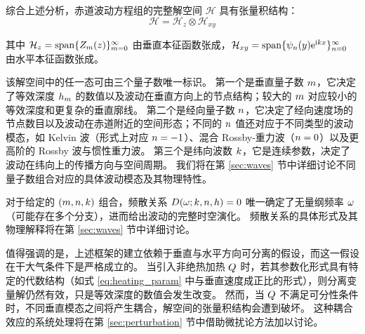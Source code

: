 综合上述分析，赤道波动方程组的完整解空间 $\mathcal{H}$ 具有张量积结构：
\begin{equation}
    \mathcal{H} = \mathcal{H}_z \otimes \mathcal{H}_{xy}
    \label{eq:solution_space}
\end{equation}

其中 $\mathcal{H}_z = \mathrm{span}\{Z_m(z)\}_{m=0}^\infty$ 由垂直本征函数张成，$\mathcal{H}_{xy} = \mathrm{span}\{\psi_{n}(y)\mathrm{e}^{\mathrm{i}k x}\}_{n=0}^\infty$ 由水平本征函数张成。

该解空间中的任一态可由三个量子数唯一标识。
第一个是垂直量子数 $m$，它决定了等效深度 $h_m$ 的数值以及波动在垂直方向上的节点结构；较大的 $m$ 对应较小的等效深度和更复杂的垂直廓线。
第二个是经向量子数 $n$，它决定了经向速度场的节点数目以及波动在赤道附近的空间形态；不同的 $n$ 值还对应于不同类型的波动模态，如 Kelvin 波（形式上对应 $n = -1$）、混合 Rossby-重力波（$n = 0$）以及更高阶的 Rossby 波与惯性重力波。
第三个是纬向波数 $k$，它是连续参数，决定了波动在纬向上的传播方向与空间周期。
我们将在第 \ref{sec:waves} 节中详细讨论不同量子数组合对应的具体波动模态及其物理特性。

对于给定的 $(m, n, k)$ 组合，频散关系 $D(\omega; k, n, h) = 0$ 唯一确定了无量纲频率 $\omega$（可能存在多个分支），进而给出波动的完整时空演化。
频散关系的具体形式及其物理解释将在第 \ref{sec:waves} 节中详细讨论。

值得强调的是，上述框架的建立依赖于垂直与水平方向可分离的假设，而这一假设在干大气条件下是严格成立的。
当引入非绝热加热 $Q$ 时，若其参数化形式具有特定的代数结构（如式 \eqref{eq:heating_param} 中与垂直速度成正比的形式），则分离变量解仍然有效，只是等效深度的数值会发生改变。
然而，当 $Q$ 不满足可分性条件时，不同垂直模态之间将产生耦合，解空间的张量积结构会遭到破坏。
这种耦合效应的系统处理将在第 \ref{sec:perturbation} 节中借助微扰论方法加以讨论。
